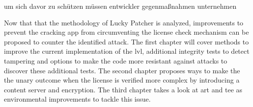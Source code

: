 um sich davor zu schützen müssen entwickler gegenmaßnahmen unternehmen


Now that that the methodology of Lucky Patcher is analyzed, improvements to prevent the cracking app from circumventing the license check mechanism can be proposed to counter the identified attack.
The first chapter will cover methods to improve the current implementation of the \gls{lvl}, additional integrity tests to detect tampering and options to make the code more resistant against attacks to discover these additional tests.
The second chapter proposes ways to make the the unary outcome when the license is verified more complex by introducing a content server and encryption.
The third chapter takes a look at \gls{art} and \gls{tee} as environmental improvements to tackle this issue.
